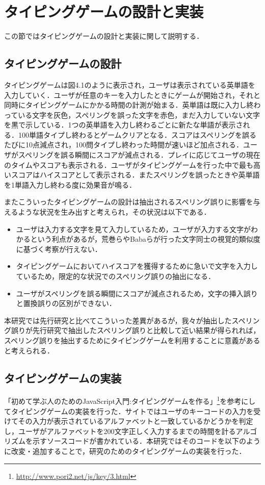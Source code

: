 \chapter{タイピングゲームの設計と実装}
この節ではタイピングゲームの設計と実装に関して説明する．

\section{タイピングゲームの設計}
タイピングゲームは図4.1のように表示され，ユーザは表示されている英単語を入力していく．ユーザが任意のキーを入力したときにゲームが開始され，それと同時にタイピングゲームにかかる時間の計測が始まる．英単語は既に入力し終わっている文字を灰色，スペリングを誤った文字を赤色，まだ入力していない文字を黒で示している．1つの英単語を入力し終わるごとに新たな単語が表示される．100単語タイプし終わるとゲームクリアとなる．スコアはスペリングを誤るたびに10点減点され，100問タイプし終わった時間が速いほど加点される．ユーザがスペリングを誤る瞬間にスコアが減点される．プレイに応じてユーザの現在のタイムやスコアも表示される．ユーザがタイピングゲームを行った中で最も高いスコアはハイスコアとして表示される．またスペリングを誤ったときや英単語を1単語入力し終わる度に効果音が鳴る．

またこういったタイピングゲームの設計は抽出されるスペリング誤りに影響を与えるような状況を生み出すと考えられ，その状況は以下である．

\begin{itemize}
 \item ユーザは入力する文字を見て入力しているため，ユーザが入力する文字がわかるという利点があるが，荒巻ら\cite{aramakiNLP2010}やBabaら\cite{babaACL2012}が行った文字同士の視覚的類似度に基づく考察が行えない．
 \item タイピングゲームにおいてハイスコアを獲得するために急いで文字を入力しているため，限定的な状況でのスペリング誤りの抽出になる．
 \item ユーザがスペリングを誤る瞬間にスコアが減点されるため，文字の挿入誤りと置換誤りの区別ができない．
\end{itemize}

本研究では先行研究と比べてこういった差異があるが，我々が抽出したスペリング誤りが先行研究で抽出したスペリング誤りと比較して近い結果が得られれば，スペリング誤りを抽出するためにタイピングゲームを利用することに意義があると考えられる．

\section{タイピングゲームの実装}
「初めて学ぶ人のためのJavaScript入門:タイピングゲームを作る」\footnote{\url{http://www.pori2.net/js/key/3.html}}を参考にしてタイピングゲームの実装を行った．サイトではユーザのキーコードの入力を受けてその入力が表示されているアルファベットと一致しているかどうかを判定し，ユーザがアルファベットを200文字正しく入力するまでの時間を計るアルゴリズムを示すソースコードが書かれている．本研究ではそのコードを以下のように改変・追加することで，研究のためのタイピングゲームの実装を行った．

